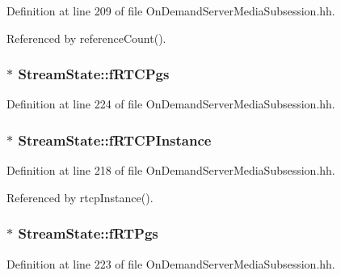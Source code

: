 Definition at line 209 of file On\+Demand\+Server\+Media\+Subsession.\+hh.



Referenced by reference\+Count().

\subsubsection[{f\+R\+T\+C\+Pgs}]{$\ast$ Stream\+State\+::f\+R\+T\+C\+Pgs\hspace{0.3cm}{\ttfamily [private]}}\label{classStreamState_a7703bbe48caa0b45b886a1512e6f010b}


Definition at line 224 of file On\+Demand\+Server\+Media\+Subsession.\+hh.

\subsubsection[{f\+R\+T\+C\+P\+Instance}]{$\ast$ Stream\+State\+::f\+R\+T\+C\+P\+Instance\hspace{0.3cm}{\ttfamily [private]}}\label{classStreamState_af8e6c3733115c25680f2b4850186134d}


Definition at line 218 of file On\+Demand\+Server\+Media\+Subsession.\+hh.



Referenced by rtcp\+Instance().

\subsubsection[{f\+R\+T\+Pgs}]{$\ast$ Stream\+State\+::f\+R\+T\+Pgs\hspace{0.3cm}{\ttfamily [private]}}\label{classStreamState_a9f95f5a2e1ce38242185f32831971b87}


Definition at line 223 of file On\+Demand\+Server\+Media\+Subsession.\+hh.

